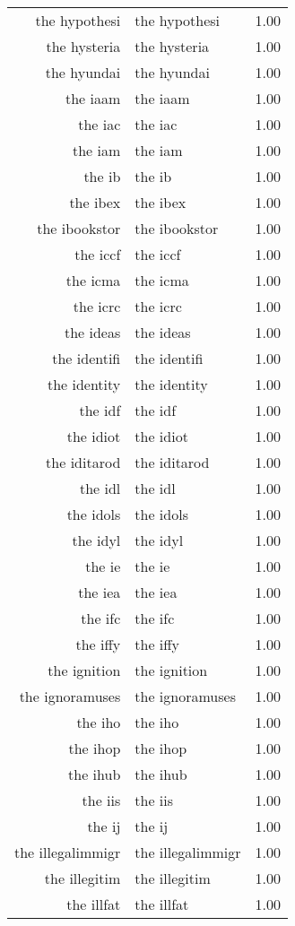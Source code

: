 \begin{table}[ht]
\begin{tabular}{rlr}
  the hypothesi & the hypothesi & 1.00 \\ 
  the hysteria & the hysteria & 1.00 \\ 
  the hyundai & the hyundai & 1.00 \\ 
  the iaam & the iaam & 1.00 \\ 
  the iac & the iac & 1.00 \\ 
  the iam & the iam & 1.00 \\ 
  the ib & the ib & 1.00 \\ 
  the ibex & the ibex & 1.00 \\ 
  the ibookstor & the ibookstor & 1.00 \\ 
  the iccf & the iccf & 1.00 \\ 
  the icma & the icma & 1.00 \\ 
  the icrc & the icrc & 1.00 \\ 
  the ideas & the ideas & 1.00 \\ 
  the identifi & the identifi & 1.00 \\ 
  the identity & the identity & 1.00 \\ 
  the idf & the idf & 1.00 \\ 
  the idiot & the idiot & 1.00 \\ 
  the iditarod & the iditarod & 1.00 \\ 
  the idl & the idl & 1.00 \\ 
  the idols & the idols & 1.00 \\ 
  the idyl & the idyl & 1.00 \\ 
  the ie & the ie & 1.00 \\ 
  the iea & the iea & 1.00 \\ 
  the ifc & the ifc & 1.00 \\ 
  the iffy & the iffy & 1.00 \\ 
  the ignition & the ignition & 1.00 \\ 
  the ignoramuses & the ignoramuses & 1.00 \\ 
  the iho & the iho & 1.00 \\ 
  the ihop & the ihop & 1.00 \\ 
  the ihub & the ihub & 1.00 \\ 
  the iis & the iis & 1.00 \\ 
  the ij & the ij & 1.00 \\ 
  the illegalimmigr & the illegalimmigr & 1.00 \\ 
  the illegitim & the illegitim & 1.00 \\ 
  the illfat & the illfat & 1.00 \\ 

\end{tabular}
\end{table}
